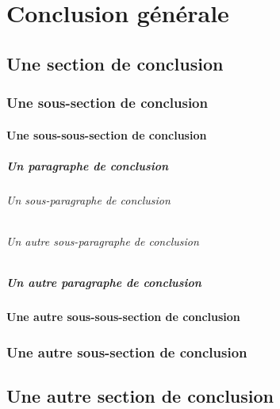 \chapter*{Conclusion générale}
\lipsum[26-27]
\section{Une section de conclusion}
\lipsum[28-29]
\subsection{Une sous-section de conclusion}
\lipsum[29-31]
\subsubsection{Une sous-sous-section de conclusion}
\lipsum[31-35]
\paragraph{Un paragraphe de conclusion}
\lipsum[36-38]
\subparagraph{Un sous-paragraphe de conclusion}
\lipsum[39-41]
\subparagraph{Un autre sous-paragraphe de conclusion}
\lipsum[39-41]
\paragraph{Un autre paragraphe de conclusion}
\lipsum[36-38]
\subsubsection{Une autre sous-sous-section de conclusion}
\lipsum[31-37]
\subsection{Une autre sous-section de conclusion}
\lipsum[29-31]
\section{Une autre section de conclusion}
\lipsum[28-43]
